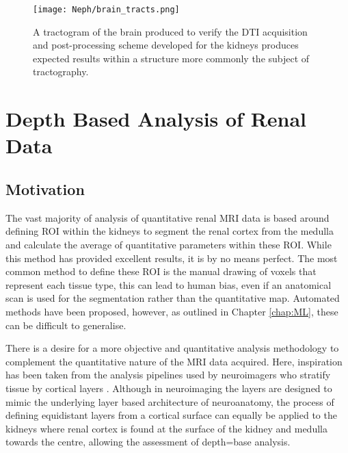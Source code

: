 \begin{figure}[H]
	\centering
	\texttt{[image: Neph/brain\_tracts.png]}
	\caption{A tractogram of the brain produced to verify the \ac{DTI} acquisition and post-processing scheme developed for the kidneys produces expected results within a structure more commonly the subject of tractography.}
	\label{fig:ex_dti_brain_tracts}	
\end{figure}

\section{Depth Based Analysis of Renal Data}
\label{sec:ex_layers}
\subsection{Motivation}
The vast majority of analysis of quantitative renal \ac{MRI} data is based around defining \ac{ROI} within the kidneys to segment the renal cortex from the medulla and calculate the average of quantitative parameters within these \ac{ROI}. While this method has provided excellent results, it is by no means perfect. The most common method to define these \ac{ROI} is the manual drawing of voxels that represent each tissue type, this can lead to human bias, even if an anatomical scan is used for the segmentation rather than the quantitative map. Automated methods have been proposed, however, as outlined in Chapter \ref{chap:ML}, these can be difficult to generalise.

There is a desire for a more objective and quantitative analysis methodology to complement the quantitative nature of the \ac{MRI} data acquired. Here, inspiration has been taken from the analysis pipelines used by neuroimagers who stratify tissue by cortical layers \cite{self_benchmarking_2019, muckli_contextual_2015, waehnert_anatomically_2014, taso_regional_2021}. Although in neuroimaging the layers are designed to mimic the underlying layer based architecture of neuroanatomy, the process of defining equidistant layers from a cortical surface can equally be applied to the kidneys where renal cortex is found at the surface of the kidney and medulla towards the centre, allowing the assessment of depth=base analysis. 

